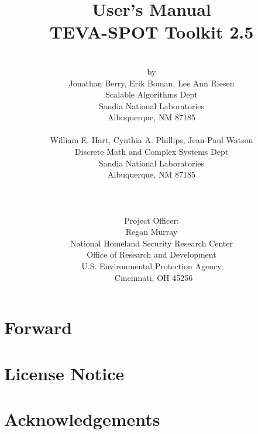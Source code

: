 \documentclass[pdf,report]{EPAmanual}
\title{\sc User's Manual\\TEVA-SPOT Toolkit 2.5}
\author{\\by\\
Jonathan Berry, Erik Boman, Lee Ann Riesen\\
Scalable Algorithms Dept\\
Sandia National Laboratories\\
Albuquerque, NM 87185\\
\mbox{}\\
William E. Hart, Cynthia A. Phillips, Jean-Paul Watson\\
Discrete Math and Complex Systems Dept\\
Sandia National Laboratories\\
Albuquerque, NM 87185\\
    \\\\\\
    Project Officer:\\
    \sc Regan Murray\\
    \sc National Homeland Security Research Center\\
    \sc Office of Research and Development\\
    \sc U.S. Environmental Protection Agency\\\
    \sc Cincinnati, OH 45256
  }
\date{}
\begin{document}
  \maketitle

  \clearpage
  
  
  \clearpage
  \chapter*{Forward}
  

  \clearpage
  \chapter*{License Notice}
  

  \clearpage
  \chapter*{Acknowledgements}
  

  \cleardoublepage
  \tableofcontents

  \SANDmain



\newpage




\newpage

\appendix


%

  
\end{document}
